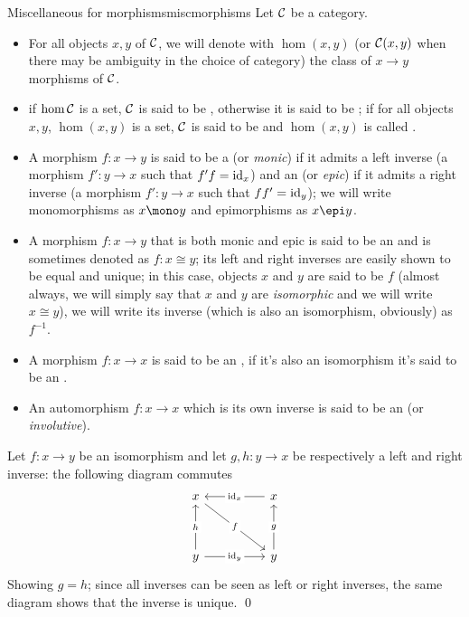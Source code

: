 \documentclass{article}
\begin{document}
\begin{definition}{Miscellaneous for morphisms}{miscmorphisms}
    Let $\mathcal{C}$ be a category.\begin{itemize}
        \item For all objects $x,y$ of $\mathcal{C}$, we will denote with $\hom(x,y)$ (or $\mathcal{C}(x,y)$ when there may be ambiguity in the choice of category) the class of $x\to y$ morphisms of $\mathcal{C}$.
        \item if $\hom\mathcal{C}$ is a set, $\mathcal{C}$ is said to be , otherwise it is said to be ; if for all objects $x,y$, $\hom(x,y)$ is a set, $\mathcal{C}$ is said to be  and $\hom(x,y)$ is called .
        \item A morphism $f: x\to y$ is said to be a  (or \emph{monic}) if it admits a left inverse (a morphism $f': y\to x$ such that $f'f = \operatorname{id}_x$) and an  (or \emph{epic}) if it admits a right inverse (a morphism $f' : y\to x$ such that $ff' = \operatorname{id}_y$); we will write monomorphisms as $x\mono y$ and epimorphisms as $x \epi y$.
        \item A morphism $f: x\to y$ that is both monic and epic is said to be an  and is sometimes denoted as $f: x\cong y$; its left and right inverses are easily shown to be equal and unique; in this case, objects $x$ and $y$ are said to be  $f$ (almost always, we will simply say that $x$ and $y$ are \emph{isomorphic} and we will write $x\cong y$), we will write its inverse (which is also an isomorphism, obviously) as $f^{-1}$.
        \item A morphism $f:x\to x$ is said to be an , if it's also an isomorphism it's said to be an .
        \item An automorphism $f : x\to x$ which is its own inverse is said to be an  (or \emph{involutive}).
    \end{itemize}
    \proof 
    Let $f: x\to y$ be an isomorphism and let $g, h : y\to x$ be respectively a left and right inverse: the following diagram commutes
    \[\begin{tikzcd}
	    x && x \\
	    \\
	    y && y
	    \arrow["f"{description}, from=1-1, to=3-3]
	    \arrow["{\id_x}"{description}, from=1-3, to=1-1]
	    \arrow["h"{description}, from=3-1, to=1-1]
	    \arrow["{\id_y}"{description}, from=3-1, to=3-3]
	    \arrow["g"{description}, from=3-3, to=1-3]
    \end{tikzcd}\]
    Showing $g = h$; since all inverses can be seen as left or right inverses, the same diagram shows that the inverse is unique.
    \qed
\end{definition}
\end{document}

